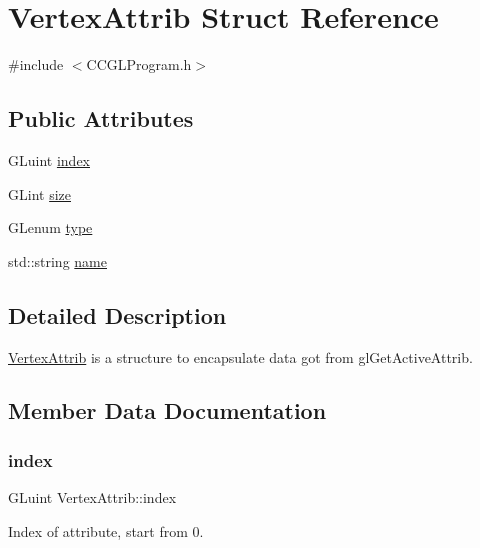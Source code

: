 \hypertarget{structVertexAttrib}{}\section{Vertex\+Attrib Struct Reference}
\label{structVertexAttrib}


{\ttfamily \#include $<$C\+C\+G\+L\+Program.\+h$>$}

\subsection*{Public Attributes}
\begin{DoxyCompactItemize}
\item 
G\+Luint \hyperlink{structVertexAttrib_ab6a1e1c5b9a3683f262527eb087b96c2}{index}
\item 
G\+Lint \hyperlink{structVertexAttrib_af3234dae1a8d73dba4659245a3ea26a1}{size}
\item 
G\+Lenum \hyperlink{structVertexAttrib_a3b680eabd2a7ceccf1647774c19ca689}{type}
\item 
std\+::string \hyperlink{structVertexAttrib_a8c8344624678eedb7eba335e99752f59}{name}
\end{DoxyCompactItemize}


\subsection{Detailed Description}
\hyperlink{structVertexAttrib}{Vertex\+Attrib} is a structure to encapsulate data got from gl\+Get\+Active\+Attrib. 

\subsection{Member Data Documentation}
\mbox{\label{structVertexAttrib_ab6a1e1c5b9a3683f262527eb087b96c2}} 
\subsubsection{\texorpdfstring{index}{index}}
{\footnotesize\ttfamily G\+Luint Vertex\+Attrib\+::index}

Index of attribute, start from 0. \mbox{\label{structVertexAttrib_a8c8344624678eedb7eba335e99752f59}} 
